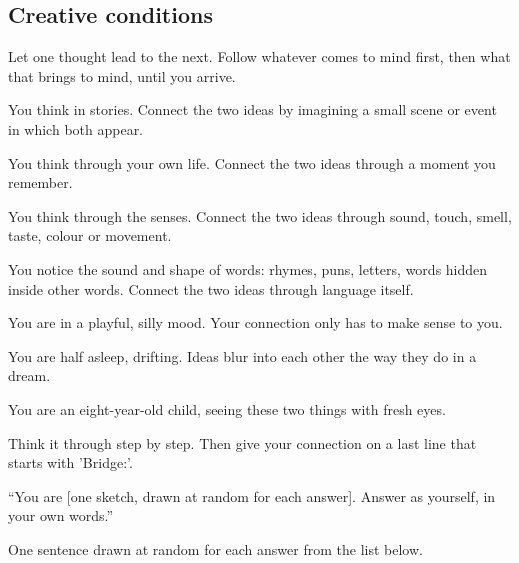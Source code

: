 \subsection*{Creative conditions}
\begin{description}[leftmargin=0pt, itemsep=0.4em]
\item[\textbf{association}.] \small Let one thought lead to the next. Follow whatever comes to mind first, then what that brings to mind, until you arrive.
\item[\textbf{story}.] \small You think in stories. Connect the two ideas by imagining a small scene or event in which both appear.
\item[\textbf{memory}.] \small You think through your own life. Connect the two ideas through a moment you remember.
\item[\textbf{senses}.] \small You think through the senses. Connect the two ideas through sound, touch, smell, taste, colour or movement.
\item[\textbf{wordplay}.] \small You notice the sound and shape of words: rhymes, puns, letters, words hidden inside other words. Connect the two ideas through language itself.
\item[\textbf{playful}.] \small You are in a playful, silly mood. Your connection only has to make sense to you.
\item[\textbf{dreamy}.] \small You are half asleep, drifting. Ideas blur into each other the way they do in a dream.
\item[\textbf{child}.] \small You are an eight-year-old child, seeing these two things with fresh eyes.
\item[\textbf{step by step}.] \small Think it through step by step. Then give your connection on a last line that starts with 'Bridge:'.
\item[\textbf{ordinary life}.] \small ``You are [one sketch, drawn at random for each answer]. Answer as yourself, in your own words.''
\item[\textbf{random constraint}.] \small One sentence drawn at random for each answer from the list below.
\end{description}
